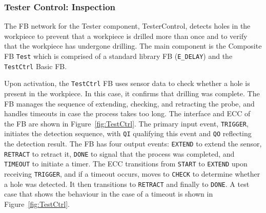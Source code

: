 \begin{bibunit}
\subsubsection{Tester Control: Inspection}
The FB network for the Tester component, TesterControl, detects holes in the workpiece to prevent that a workpiece is drilled more than once and to verify that the workpiece has undergone drilling. The main component is the Composite FB \texttt{Test} which is comprised of a standard library FB (\texttt{E\_DELAY}) and the \texttt{TestCtrl} Basic FB. 

Upon activation, the \texttt{TestCtrl} FB uses sensor data to check whether a hole is present in the workpiece. In this case, it confirms that drilling was complete. The FB manages the sequence of extending, checking, and retracting the probe, and handles timeouts in case the process takes too long. The interface and ECC of the FB are shown in Figure~\ref{fig:TestCtrl}. 
The primary input event, \texttt{TRIGGER}, initiates the detection sequence, with \texttt{QI} qualifying this event and \texttt{QO} reflecting the detection result. The FB has four output events: \texttt{EXTEND} to extend the sensor, \texttt{RETRACT} to retract it, \texttt{DONE} to signal that the process was completed, and \texttt{TIMEOUT} to initiate a timer. The ECC transitions from \texttt{START} to \texttt{EXTEND} upon receiving \texttt{TRIGGER}, and if a timeout occurs, moves to \texttt{CHECK} to determine whether a hole was detected. It then transitions to \texttt{RETRACT} and finally to \texttt{DONE}. A test case that shows the behaviour in the case of a timeout is shown in Figure~\ref{fig:TestCtrl}.


\end{bibunit}
